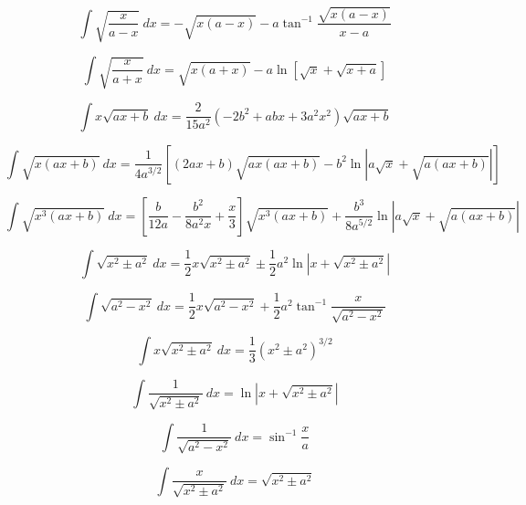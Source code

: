 \begin{equation*}
\int \sqrt{\frac{x}{a-x}}\ dx =  -\sqrt{x(a-x)}
-a\tan^{-1}\frac{\sqrt{x(a-x)}}{x-a}
\end{equation*}

\begin{equation*}
\int \sqrt{\frac{x}{a+x}}\ dx =  \sqrt{x(a+x)} 
-a\ln \left [ \sqrt{x} + \sqrt{x+a}\right] 
\end{equation*}

\begin{equation*}
\int x \sqrt{ax + b}\ dx =
\frac{2}{15 a^2}(-2b^2+abx + 3 a^2 x^2)
\sqrt{ax+b}
\end{equation*}

\begin{equation*}
\int \sqrt{x(ax+b)}\ dx = \frac{1}{4a^{3/2}}\left[(2ax + b)\sqrt{ax(ax+b)} 
-b^2 \ln \left| a\sqrt{x} + \sqrt{a(ax+b)} \right| \right ] 
\end{equation*}

\begin{equation*}
\int \sqrt{x^3(ax+b)} \ dx =\left [ 
\frac{b}{12a}-
\frac{b^2}{8a^2x}+
\frac{x}{3}\right] 
\sqrt{x^3(ax+b)}  + 
\frac{b^3}{8a^{5/2}}\ln \left | a\sqrt{x} + \sqrt{a(ax+b)} \right |
\end{equation*}

\begin{equation*}
\int\sqrt{x^2 \pm a^2}\ dx = \frac{1}{2}x\sqrt{x^2\pm a^2} 
\pm\frac{1}{2}a^2 \ln \left | x + \sqrt{x^2\pm a^2} \right | 
\end{equation*}

\begin{equation*}
\int  \sqrt{a^2 - x^2}\ dx = \frac{1}{2} x \sqrt{a^2-x^2} 
+\frac{1}{2}a^2\tan^{-1}\frac{x}{\sqrt{a^2-x^2}}
\end{equation*}

\begin{equation*}
\int  x \sqrt{x^2 \pm a^2}\ dx= \frac{1}{3}\left ( x^2 \pm a^2 \right)^{3/2} 
\end{equation*}

\begin{equation*}
\int \frac{1}{\sqrt{x^2 \pm a^2}}\ dx = \ln \left | x + \sqrt{x^2 \pm a^2} \right | 
\end{equation*}

\begin{equation*}
\int \frac{1}{\sqrt{a^2 - x^2}}\ dx = \sin^{-1}\frac{x}{a} 
\end{equation*}

\begin{equation*}
\int \frac{x}{\sqrt{x^2\pm a^2}}\ dx = \sqrt{x^2 \pm a^2} 
\end{equation*}

